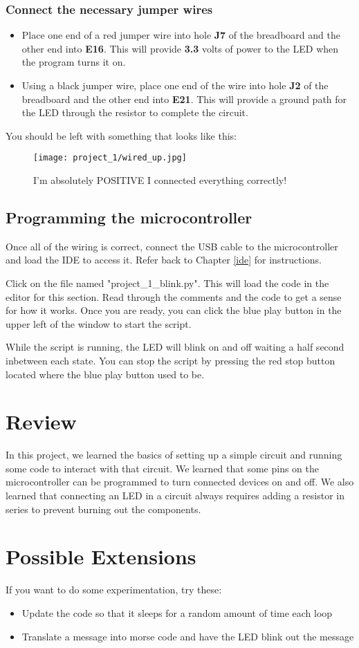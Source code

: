 \subsubsection{Connect the necessary jumper wires}
\begin{itemize}
    \item Place one end of a red jumper wire into hole \textbf{J7} of the breadboard and the other end into
    \textbf{E16}. This will provide \textbf{3.3} volts of power to the LED when the program turns it on.
    \item Using a black jumper wire, place one end of the wire into hole \textbf{J2} of the breadboard and the other
    end into \textbf{E21}. This will provide a ground path for the LED through the resistor to complete the circuit.
\end{itemize}

You should be left with something that looks like this:
\begin{figure}[H]
    \centering
    \texttt{[image: project\_1/wired\_up.jpg]}
    \caption{I'm absolutely POSITIVE I connected everything correctly!}
\end{figure}

\subsection{Programming the microcontroller}

Once all of the wiring is correct, connect the USB cable to the microcontroller and load the IDE to
access it. Refer back to Chapter \ref{ide} for instructions.

Click on the file named "project\_1\_blink.py". This will load the code in the editor for this section.
Read through the comments and the code to get a sense for how it works. Once you are ready, you can
click the blue play button in the upper left of the window to start the script.

While the script is running, the LED will blink on and off waiting a half second inbetween each state.
You can stop the script by pressing the red stop button located where the blue play button used to be.

\section{Review}
In this project, we learned the basics of setting up a simple circuit and running some code to interact
with that circuit. We learned that some pins on the microcontroller can be programmed to turn connected
devices on and off. We also learned that connecting an LED in a circuit always requires adding a resistor
in series to prevent burning out the components.

\section{Possible Extensions}
If you want to do some experimentation, try these:

\begin{itemize}
    \item Update the code so that it sleeps for a random amount of time each loop
    \item Translate a message into morse code and have the LED blink out the message
\end{itemize}
